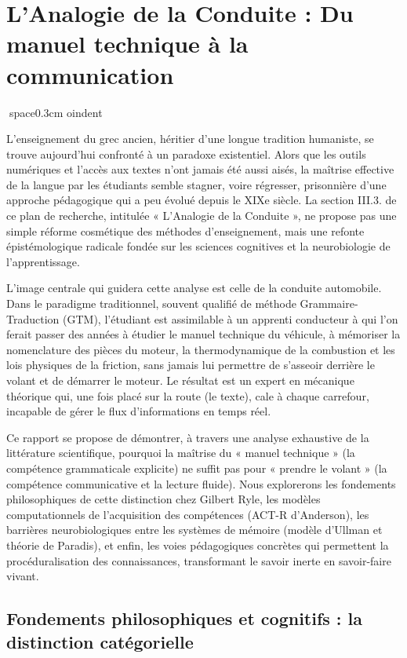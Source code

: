 

\section{L'Analogie de la Conduite : Du manuel technique à la communication}
space{0.3cm}
oindent

L'enseignement du grec ancien, héritier d'une longue tradition humaniste, se trouve aujourd'hui
confronté à un paradoxe existentiel. Alors que les outils numériques et l'accès aux textes n'ont
jamais été aussi aisés, la maîtrise effective de la langue par les étudiants semble stagner, voire
régresser, prisonnière d'une approche pédagogique qui a peu évolué depuis le XIXe siècle. La section
III.3.\cite{III-3-3-ref3} de ce plan de recherche, intitulée « L'Analogie de la Conduite », ne
propose pas une simple réforme cosmétique des méthodes d'enseignement, mais une refonte
épistémologique radicale fondée sur les sciences cognitives et la neurobiologie de l'apprentissage.

L'image centrale qui guidera cette analyse est celle de la conduite automobile. Dans le paradigme
traditionnel, souvent qualifié de méthode Grammaire-Traduction (GTM), l'étudiant est assimilable à
un apprenti conducteur à qui l'on ferait passer des années à étudier le manuel technique du
véhicule, à mémoriser la nomenclature des pièces du moteur, la thermodynamique de la combustion et
les lois physiques de la friction, sans jamais lui permettre de s'asseoir derrière le volant et de
démarrer le moteur. Le résultat est un expert en mécanique théorique qui, une fois placé sur la
route (le texte), cale à chaque carrefour, incapable de gérer le flux d'informations en temps réel.

Ce rapport se propose de démontrer, à travers une analyse exhaustive de la littérature scientifique,
pourquoi la maîtrise du « manuel technique » (la compétence grammaticale explicite) ne suffit pas
pour « prendre le volant » (la compétence communicative et la lecture fluide). Nous explorerons les
fondements philosophiques de cette distinction chez Gilbert Ryle, les modèles computationnels de
l'acquisition des compétences (ACT-R d'Anderson), les barrières neurobiologiques entre les systèmes
de mémoire (modèle d'Ullman et théorie de Paradis), et enfin, les voies pédagogiques concrètes qui
permettent la procéduralisation des connaissances, transformant le savoir inerte en savoir-faire
vivant.



\subsection{Fondements philosophiques et cognitifs : la distinction catégorielle}


